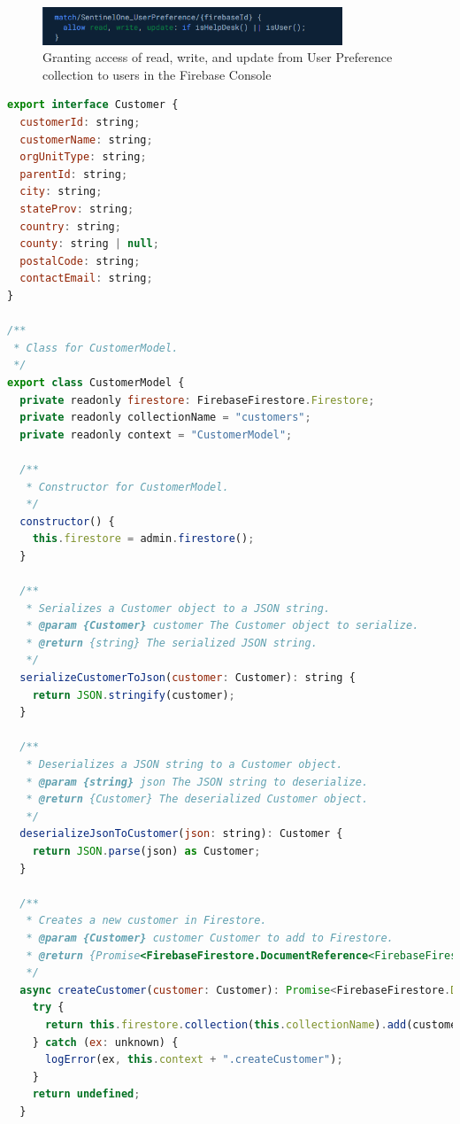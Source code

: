 \begin{figure}[htbp]
  \centering
  \includegraphics[width=0.8\textwidth]{Figures/User Preference.png}
  \caption{Granting access of read, write, and update from User Preference collection to users in the Firebase Console}
\end{figure}


\begin{lstlisting}[language=JavaScript, caption={Model class in the back-end}]
  export interface Customer {
  customerId: string;
  customerName: string;
  orgUnitType: string;
  parentId: string;
  city: string;
  stateProv: string;
  country: string;
  county: string | null;
  postalCode: string;
  contactEmail: string;
}

/**
 * Class for CustomerModel.
 */
export class CustomerModel {
  private readonly firestore: FirebaseFirestore.Firestore;
  private readonly collectionName = "customers";
  private readonly context = "CustomerModel";

  /**
   * Constructor for CustomerModel.
   */
  constructor() {
    this.firestore = admin.firestore();
  }

  /**
   * Serializes a Customer object to a JSON string.
   * @param {Customer} customer The Customer object to serialize.
   * @return {string} The serialized JSON string.
   */
  serializeCustomerToJson(customer: Customer): string {
    return JSON.stringify(customer);
  }

  /**
   * Deserializes a JSON string to a Customer object.
   * @param {string} json The JSON string to deserialize.
   * @return {Customer} The deserialized Customer object.
   */
  deserializeJsonToCustomer(json: string): Customer {
    return JSON.parse(json) as Customer;
  }

  /**
   * Creates a new customer in Firestore.
   * @param {Customer} customer Customer to add to Firestore.
   * @return {Promise<FirebaseFirestore.DocumentReference<FirebaseFirestore.DocumentData>> | undefined}.
   */
  async createCustomer(customer: Customer): Promise<FirebaseFirestore.DocumentReference<FirebaseFirestore.DocumentData> | undefined> {
    try {
      return this.firestore.collection(this.collectionName).add(customer);
    } catch (ex: unknown) {
      logError(ex, this.context + ".createCustomer");
    }
    return undefined;
  }


\end{lstlisting}
